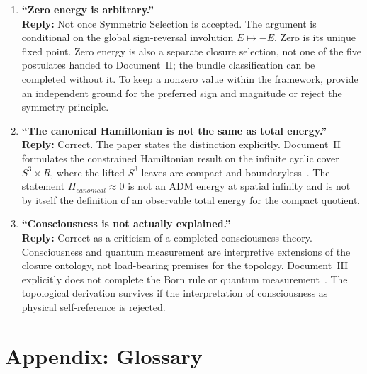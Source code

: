 \documentclass[11pt]{article}
\theoremstyle{canonstyle}
\def\mathrm#1{#1}%
\def\mathbb#1{#1}%
\begin{document}
\begin{enumerate}
    \item \textbf{``Zero energy is arbitrary.''} \\
    \textbf{Reply:} Not once Symmetric Selection is accepted. The argument is conditional on the global sign-reversal involution $E \mapsto -E$. Zero is its unique fixed point. Zero energy is also a separate closure selection, not one of the five postulates handed to Document~II; the bundle classification can be completed without it. To keep a nonzero value within the framework, provide an independent ground for the preferred sign and magnitude or reject the symmetry principle.

    \item \textbf{``The canonical Hamiltonian is not the same as total energy.''} \\
    \textbf{Reply:} Correct. The paper states the distinction explicitly. Document~II formulates the constrained Hamiltonian result on the infinite cyclic cover $S^3 \times \mathbb{R}$, where the lifted $S^3$ leaves are compact and boundaryless~\cite{CanonWhat}. The statement $H_{\mathrm{canonical}} \approx 0$ is not an ADM energy at spatial infinity and is not by itself the definition of an observable total energy for the compact quotient.

    \item \textbf{``Consciousness is not actually explained.''} \\
    \textbf{Reply:} Correct as a criticism of a completed consciousness theory. Consciousness and quantum measurement are interpretive extensions of the closure ontology, not load-bearing premises for the topology. Document~III explicitly does not complete the Born rule or quantum measurement~\cite{CanonHow}. The topological derivation survives if the interpretation of consciousness as physical self-reference is rejected.
\end{enumerate}

\section*{Appendix: Glossary}
{}
\end{document}
